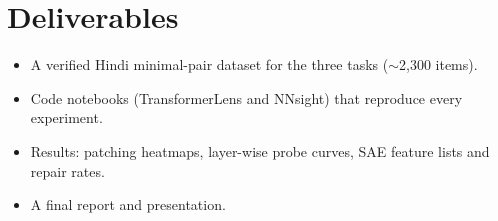 \documentclass[11pt,a4paper]{article}
\begin{document}
\section{Deliverables}

\begin{itemize}
  \item A verified Hindi minimal-pair dataset for the three tasks ($\sim$2,300 items).
  \item Code notebooks (TransformerLens and NNsight) that reproduce every experiment.
  \item Results: patching heatmaps, layer-wise probe curves, SAE feature lists and repair rates.
  \item A final report and presentation.
\end{itemize}
\end{document}
